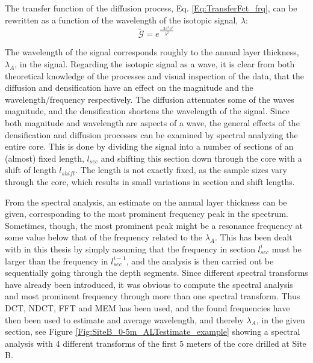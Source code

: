 \documentclass[../../CompleteThesis2/Complete_2ndDraft]{subfiles}
\begin{document}
The transfer function of the diffusion process, Eq. \ref{Eq:TransferFct_frq}, can be rewritten as a function of the wavelength of the isotopic signal, $\lambda$:
\begin{equation}
	\tilde{\mathcal{G}} = e^{\frac{-2\pi^2\sigma^2}{\lambda^2}}
	\label{Eq:TransferFct_lambda}
\end{equation}

The wavelength of the signal corresponds roughly to the annual layer thickness, $\lambda_A$, in the signal. Regarding the isotopic signal as a wave, it is clear from both theoretical knowledge of the processes and visual inspection of the data, that the diffusion and densification have an effect on the magnitude and the wavelength/frequency respectively. The diffusion attenuates some of the waves magnitude, and the densification shortens the wavelength of the signal. Since both magnitude and wavelength are aspects of a wave, the general effects of the densification and diffusion processes can be examined by spectral analyzing the entire core. This is done by dividing the signal into a number of sections of an (almost) fixed length, $l_{sec}$ and shifting this section down through the core with a shift of length $l_{shift}$. The length is not exactly fixed, as the sample sizes vary through the core, which results in small variations in section and shift lengths.

From the spectral analysis, an estimate on the annual layer thickness can be given, corresponding to the most prominent frequency peak in the spectrum. Sometimes, though, the most prominent peak might be a resonance frequency at some value below that of the frequency related to the $\lambda_A$. This has been dealt with in this thesis by simply assuming that the frequency in section $l_{sec}^i$ must be larger than the frequency in $l_{sec}^{i-1}$, and the analysis is then carried out be sequentially going through the depth segments. Since different spectral transforms have already been introduced, it was obvious to compute the spectral analysis and most prominent frequency through more than one spectral transform. Thus DCT, NDCT, FFT and MEM has been used, and the found frequencies have then been used to estimate and average wavelength, and thereby $\lambda_A$, in the given section, see Figure \ref{Fig:SiteB_0-5m_ALTestimate_example} showing a spectral analysis with 4 different transforms of the first 5 meters of the core drilled at Site B.
\end{document}
